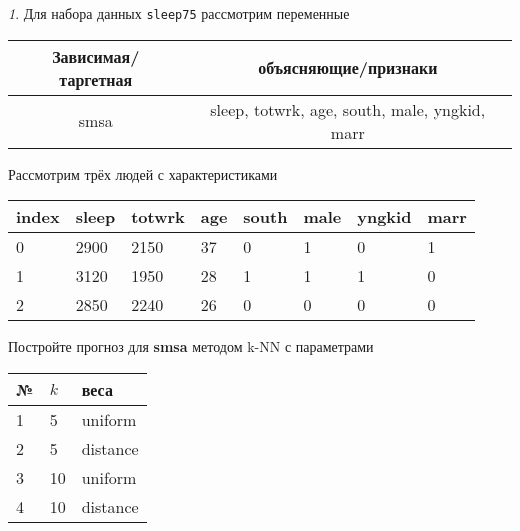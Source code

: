 \documentclass[12pt]{article}
\theoremstyle{remark}
\newtheorem{exercise}{}[section]
\begin{document}
\begin{exercise}
Для набора данных \texttt{sleep75} рассмотрим переменные
\begin{center}
	\begin{tabular}{|c|c|} \hline
		Зависимая/таргетная & объясняющие/признаки \\ \hline
		smsa & sleep, totwrk, age, south, male, yngkid, marr \\ \hline
	\end{tabular}
\end{center}
Рассмотрим трёх людей с характеристиками
\begin{center}
	\begin{tabular}{|l||l|l|l|l|l|l|l|}\hline
		index & sleep & totwrk & age & south & male & yngkid & marr \\ \hline\hline
		0 & 2900 & 2150 & 37 & 0 & 1 &  0 & 1 \\
		1 & 3120 & 1950 & 28 & 1 & 1 &  1 & 0 \\
		2 & 2850 & 2240 & 26 & 0 & 0 &  0 & 0 \\ \hline
	\end{tabular}
\end{center}
Постройте прогноз для \textbf{smsa} методом k-NN с параметрами
\begin{center}
	\begin{tabular}{|l|l|l|}\hline
	№ & \(k\) & веса \\ \hline
	1 & 5 & uniform \\
	2 & 5 & distance \\
	3 & 10 & uniform \\
	4 & 10 & distance \\ \hline
	\end{tabular}
\end{center}
\end{exercise}
\end{document}
